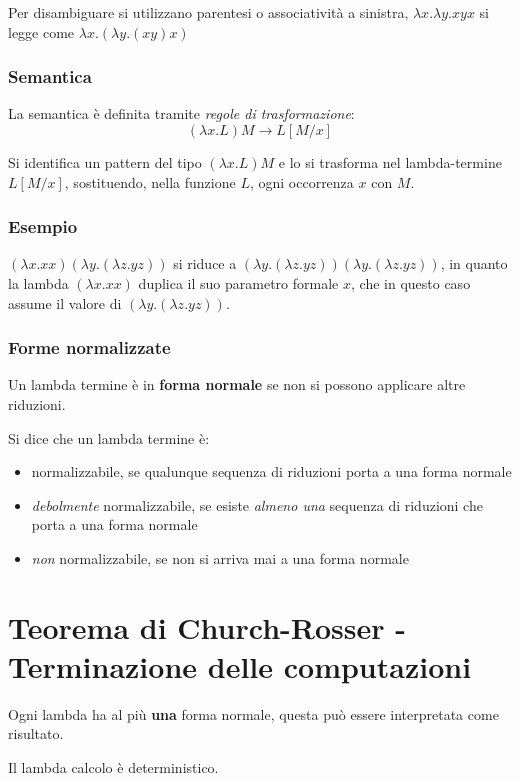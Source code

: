 Per disambiguare si utilizzano parentesi o associatività a sinistra, $\lambda x.\lambda y.xyx$ si legge come $\lambda x.(\lambda y.(xy)x)$

\subsubsection{Semantica}
La semantica è definita tramite \textit{regole di trasformazione}:
\begin{equation*}
(\lambda x.L)M \rightarrow  L[M/x]
\end{equation*}

Si identifica un pattern del tipo $(\lambda x.L)M$ e lo si trasforma nel lambda-termine $L[M/x]$, sostituendo, nella funzione $L$, ogni occorrenza $x$ con $M$.

\subsubsection{Esempio}
$(\lambda x.xx)(\lambda y.(\lambda z.yz))$ si riduce a $(\lambda y.(\lambda z.yz))(\lambda y.(\lambda z.yz))$, in quanto la lambda $(\lambda x.xx)$ duplica il suo parametro formale $x$, che in questo caso assume il valore di $(\lambda y.(\lambda z.yz))$.

\subsubsection{Forme normalizzate}
Un lambda termine è in \textbf{forma normale} se non si possono applicare altre riduzioni.

Si dice che un lambda termine è:
\begin{itemize}
    \item {} normalizzabile, se qualunque sequenza di riduzioni porta a una forma normale
    \item \textit{debolmente} normalizzabile, se esiste \textit{almeno una} sequenza di riduzioni che porta a una forma normale
    \item \textit{non} normalizzabile, se non si arriva mai a una forma normale
\end{itemize}

\section{Teorema di Church-Rosser - Terminazione delle computazioni}
\begin{mdframed}[topline=false,bottomline=false,rightline=false]
Ogni lambda ha al più \textbf{una} forma normale, questa può essere interpretata come risultato.

Il lambda calcolo è deterministico.
\end{mdframed}

